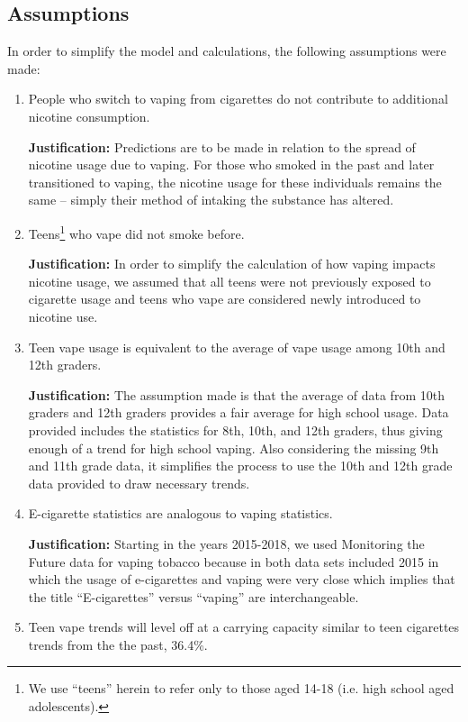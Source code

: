 \documentclass[12pt]{article}
\newcommand{\just}{\textbf{Justification: }}
\begin{document}
\subsection{Assumptions}
In order to simplify the model and calculations, the following assumptions were made:
\begin{enumerate}

\item People who switch to vaping from cigarettes do not contribute to additional nicotine consumption.

\just Predictions are to be made in relation to the spread of nicotine usage due to vaping. For those who smoked in the past and later transitioned to vaping, the nicotine usage for these individuals remains the same – simply their method of intaking the substance has altered.  

\item Teens\footnote{We use ``teens'' herein to refer only to those aged 14-18 (i.e. high school aged adolescents).} who vape did not smoke before.

\just In order to simplify the calculation of how vaping impacts nicotine usage, we assumed that all teens were not previously exposed to cigarette usage and teens who vape are considered newly introduced to nicotine use. 

\item Teen vape usage is equivalent to the average of vape usage among 10th and 12th graders.

\just The assumption made is that the average of data from 10th graders and 12th graders provides a fair average for high school usage. Data provided includes the statistics for 8th, 10th, and 12th graders, thus giving enough of a trend for high school vaping. Also considering the missing 9th and 11th grade data, it simplifies the process to use the 10th and 12th grade data provided to draw necessary trends.

\item E-cigarette statistics are analogous to vaping statistics. 

\just Starting in the years 2015-2018, we used Monitoring the Future data for vaping tobacco because in both data sets included 2015 in which the usage of e-cigarettes and vaping were very close which implies that the title “E-cigarettes” versus “vaping” are interchangeable. 

\item Teen vape trends will level off at a carrying capacity similar to teen cigarettes trends from the the past, 36.4\%.


\end{enumerate}
\end{document}
